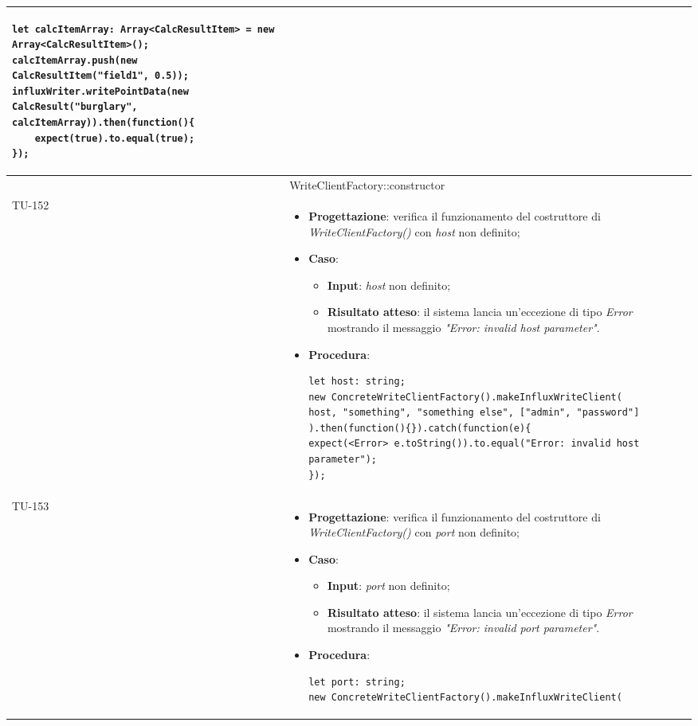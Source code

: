 \begin{longtable}{|C{1.5cm}|C{14.5cm}|}
\begin{itemize}
\begin{lstlisting}
let calcItemArray: Array<CalcResultItem> = new Array<CalcResultItem>();
calcItemArray.push(new CalcResultItem("field1", 0.5));
influxWriter.writePointData(new CalcResult("burglary", calcItemArray)).then(function(){
	expect(true).to.equal(true);
});
	\end{lstlisting}
\end{itemize}\\
\hline
{} & WriteClientFactory::constructor
\\ \hline
{TU-152} &
\begin{itemize}
	\item \textbf{Progettazione}: verifica il funzionamento del costruttore di \emph{WriteClientFactory()} con \emph{host} non definito;
	\item \textbf{Caso}: 
	\begin{itemize}
		\item \textbf{Input}: \emph{host} non definito;
		\item \textbf{Risultato atteso}: il sistema lancia un'eccezione di tipo \emph{Error} mostrando il messaggio \emph{"Error: invalid host parameter"}.
	\end{itemize}
	\item \textbf{Procedura}:
	\begin{lstlisting}
let host: string;
new ConcreteWriteClientFactory().makeInfluxWriteClient(
host, "something", "something else", ["admin", "password"]
).then(function(){}).catch(function(e){
expect(<Error> e.toString()).to.equal("Error: invalid host parameter");
});
	\end{lstlisting}
\end{itemize}\\
\hline
{TU-153} &
\begin{itemize}
	\item \textbf{Progettazione}: verifica il funzionamento del costruttore di \emph{WriteClientFactory()} con \emph{port} non definito;
	\item \textbf{Caso}: 
	\begin{itemize}
		\item \textbf{Input}: \emph{port} non definito;
		\item \textbf{Risultato atteso}: il sistema lancia un'eccezione di tipo \emph{Error} mostrando il messaggio \emph{"Error: invalid port parameter"}.
	\end{itemize}
	\item \textbf{Procedura}:
	\begin{lstlisting}
let port: string;
new ConcreteWriteClientFactory().makeInfluxWriteClient(

\end{lstlisting}
\end{itemize}
\end{longtable}
